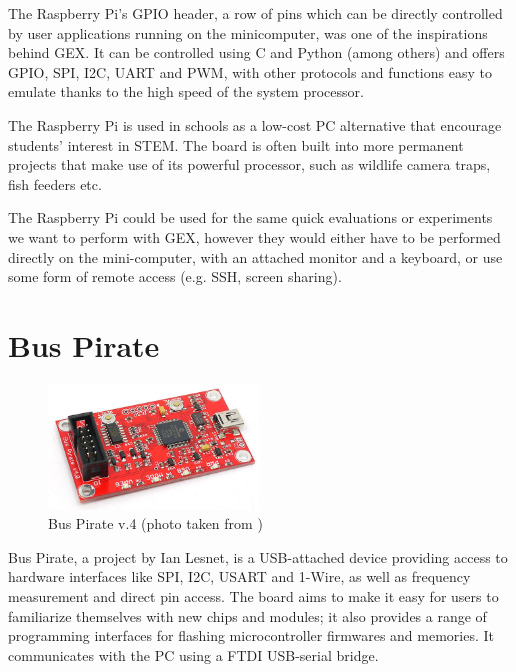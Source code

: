 The Raspberry Pi's \gls{GPIO} header, a row of pins which can be directly controlled by user applications running on the minicomputer, was one of the inspirations behind GEX. It can be controlled using C and Python (among others) and offers \gls{GPIO}, \gls{SPI}, \gls{I2C}, \gls{UART} and \gls{PWM}, with other protocols and functions easy to emulate thanks to the high speed of the system processor.

The Raspberry Pi is used in schools as a low-cost PC alternative that encourage students' interest in \gls{STEM}. The board is often built into more permanent projects that make use of its powerful processor, such as wildlife camera traps, fish feeders etc.

The Raspberry Pi could be used for the same quick evaluations or experiments we want to perform with GEX, however they would either have to be performed directly on the mini-computer, with an attached monitor and a keyboard, or use some form of remote access (e.g. \gls{SSH}, screen sharing).

\section{Bus Pirate}

\begin{figure}[H]
	\centering
	\includegraphics[width=0.5\textwidth] {img/buspirate.jpg}
	\caption{\label{fig:buspirate}Bus Pirate v.4 (photo taken from \cite{buspirate-product-page})}
\end{figure}


Bus Pirate, a project by Ian Lesnet, is a USB-attached device providing access to hardware interfaces like \gls{SPI}, \gls{I2C}, \gls{USART} and 1-Wire, as well as frequency measurement and direct pin access. The board aims to make it easy for users to familiarize themselves with new chips and modules; it also provides a range of programming interfaces for flashing microcontroller firmwares and memories. It communicates with the \gls{PC} using a FTDI USB-serial bridge.

